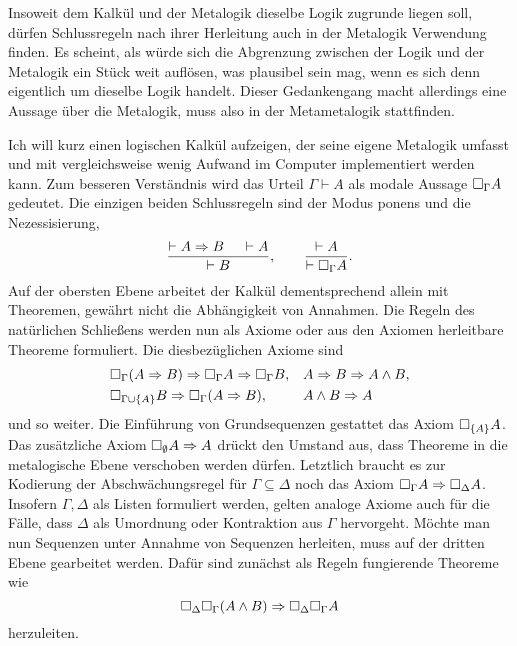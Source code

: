 Insoweit dem Kalkül und der Metalogik dieselbe Logik
zugrunde liegen soll, dürfen Schlussregeln nach ihrer Herleitung
auch in der Metalogik Verwendung finden. Es scheint, als würde sich die
Abgrenzung zwischen der Logik und der Metalogik ein Stück weit auflösen, was
plausibel  sein mag, wenn es sich denn eigentlich um dieselbe Logik handelt.
Dieser Gedankengang macht allerdings eine Aussage über die Metalogik,
muss also in der Metametalogik stattfinden.

Ich will kurz einen logischen Kalkül aufzeigen, der seine eigene
Metalogik umfasst und mit vergleichsweise wenig Aufwand im Computer
implementiert werden kann. Zum besseren Verständnis wird das Urteil
$\Gamma\vdash A$ als modale Aussage
$\Box_\Gamma A$ gedeutet. Die einzigen beiden Schlussregeln sind
der Modus ponens und die Nezessisierung,
\[\dfrac{\vdash A\Rightarrow B\quad\;\vdash A}{\vdash B},\qquad
\dfrac{\vdash A}{\vdash\Box_\Gamma A}.\]
Auf der obersten Ebene arbeitet der Kalkül dementsprechend allein mit
Theoremen, gewährt nicht die Abhängigkeit von Annahmen.
Die Regeln des natürlichen Schließens werden nun als Axiome oder
aus den Axiomen herleitbare Theoreme formuliert. Die diesbezüglichen
Axiome sind
\begin{align*}
& \Box_\Gamma (A\Rightarrow B)\Rightarrow\Box_\Gamma A\Rightarrow\Box_\Gamma B,
&& A\Rightarrow B\Rightarrow A\land B,\\
& \Box_{\Gamma\cup\{A\}} B\Rightarrow\Box_\Gamma (A\Rightarrow B),
&& A\land B\Rightarrow A
\end{align*}
und so weiter. Die Einführung von Grundsequenzen gestattet das
Axiom $\Box_{\{A\}}A$. Das zusätzliche Axiom $\Box_\emptyset A\Rightarrow A$
drückt den Umstand aus, dass Theoreme in die metalogische Ebene verschoben
werden dürfen. Letztlich braucht es zur Kodierung der Abschwächungsregel
für $\Gamma\subseteq\Delta$ noch das Axiom $\Box_\Gamma A\Rightarrow\Box_\Delta A$.
Insofern $\Gamma,\Delta$ als Listen formuliert werden, gelten analoge
Axiome auch für die Fälle, dass $\Delta$ als Umordnung oder Kontraktion
aus $\Gamma$ hervorgeht. Möchte man nun Sequenzen unter Annahme von
Sequenzen herleiten, muss auf der dritten Ebene gearbeitet werden.
Dafür sind zunächst als Regeln fungierende Theoreme wie
\[\Box_\Delta\Box_\Gamma (A\land B)\Rightarrow\Box_\Delta\Box_\Gamma A\]
herzuleiten.

